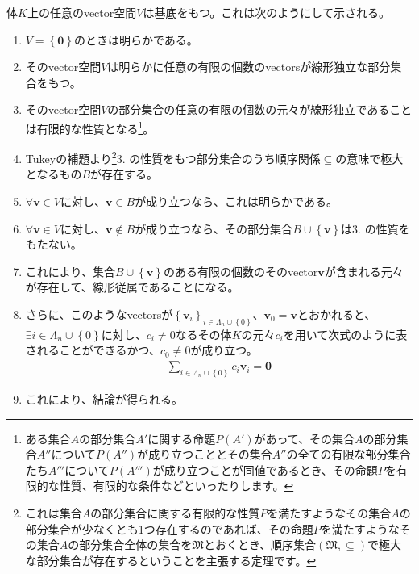 \documentclass[dvipdfmx]{jsarticle}
\begin{document}
\begin{thm}[基底の存在性]\label{2.1.1.16}
体$K$上の任意のvector空間$V$は基底をもつ。これは次のようにして示される。
\begin{enumerate}
\item
  $V = \left\{ \mathbf{0} \right\}$のときは明らかである。
\item
  そのvector空間$V$は明らかに任意の有限の個数のvectorsが線形独立な部分集合をもつ。
\item
  そのvector空間$V$の部分集合の任意の有限の個数の元々が線形独立であることは有限的な性質となる\footnote{ある集合$A$の部分集合$A'$に関する命題$P\left( A' \right)$があって、その集合$A$の部分集合$A''$について$P\left( A'' \right)$が成り立つこととその集合$A''$の全ての有限な部分集合たち$A'''$について$P\left( A''' \right)$が成り立つことが同値であるとき、その命題$P$を有限的な性質、有限的な条件などといったりします。}。
\item
  Tukeyの補題より\footnote{これは集合$A$の部分集合に関する有限的な性質$P$を満たすようなその集合$A$の部分集合が少なくとも1つ存在するのであれば、その命題$P$を満たすようなその集合$A$の部分集合全体の集合を$\mathfrak{M}$とおくとき、順序集合$\mathfrak{(M, \subseteq )}$で極大な部分集合が存在するということを主張する定理です。}3. の性質をもつ部分集合のうち順序関係$\subseteq$の意味で極大となるもの$B$が存在する。
\item
  $\forall\mathbf{v} \in V$に対し、$\mathbf{v} \in B$が成り立つなら、これは明らかである。
\item
  $\forall\mathbf{v} \in V$に対し、$\mathbf{v} \notin B$が成り立つなら、その部分集合$B \cup \left\{ \mathbf{v} \right\}$は3. の性質をもたない。
\item
  これにより、集合$B \cup \left\{ \mathbf{v} \right\}$のある有限の個数のそのvector$\mathbf{v}$が含まれる元々が存在して、線形従属であることになる。
\item
  さらに、このようなvectorsが$\left\{ \mathbf{v}_{i} \right\}_{i \in \varLambda_{n} \cup \left\{ 0 \right\}}$、$\mathbf{v}_{0} = \mathbf{v}$とおかれると、$\exists i \in \varLambda_{n} \cup \left\{ 0 \right\}$に対し、$c_{i} \neq 0$なるその体$K$の元々$c_{i}$を用いて次式のように表されることができるかつ、$c_{0} \neq 0$が成り立つ。
\begin{align*}
\sum_{i \in \varLambda_{n} \cup \left\{ 0 \right\}} {c_{i}\mathbf{v}_{i}} = \mathbf{0}
\end{align*}
\item
  これにより、結論が得られる。
\end{enumerate}
\end{thm}
\end{document}
